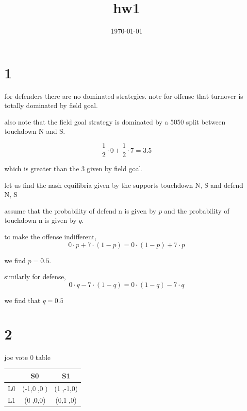 \documentclass{article}
\title{hw1}
\date{\today}
\begin{document}
\maketitle

\section{1}

for defenders there are no dominated strategies.
note for offense that turnover is totally dominated by field goal. 

also note that the field goal strategy is dominated by a 5050 split between touchdown N and S. 

\begin{equation}
    \frac{1}{2}\cdot 0+\frac{1}{2}\cdot 7 = 3.5
\end{equation}

which is greater than the 3 given by field goal. 

let us find the nash equilibria given by the supports touchdown N, S and defend N, S

assume that the probability of defend n is given by \(p\) and the probability of touchdown n is given by \(q\). 

to make the offense indifferent, 
\begin{equation}
    0\cdot p + 7\cdot (1-p) = 0\cdot (1-p)  + 7\cdot p 
\end{equation}

we find \(p=0.5\). 

similarly for defense, 
\begin{equation}
    0\cdot q - 7\cdot (1-q) = 0\cdot (1-q)  - 7\cdot q 
\end{equation}

we find that \(q=0.5\) 
\newpage
\section{2}

joe vote 0 table
\begin{table}[h!]
\centering
\begin{tabular}{c|c c}
\toprule
 & S0 & S1 \\
\midrule
L0 & (-1,\textcircled{0},\textcircled{0}) & (\textcircled{1},-1,0) \\
L1 & (\textcircled{0},0,0) & (0,\textcircled{1},0) \\
\bottomrule
\end{tabular}

\end{table}
\end{document}
